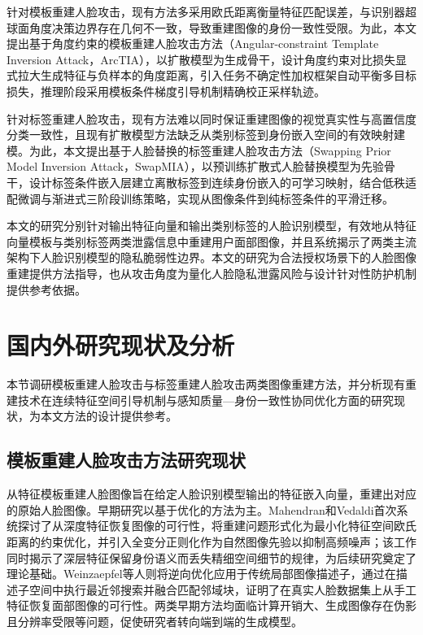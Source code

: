 针对模板重建人脸攻击，现有方法多采用欧氏距离衡量特征匹配误差，与识别器超球面角度决策边界存在几何不一致，导致重建图像的身份一致性受限。为此，本文提出基于角度约束的模板重建人脸攻击方法（Angular-constraint Template Inversion Attack，ArcTIA），以扩散模型为生成骨干，设计角度约束对比损失显式拉大生成特征与负样本的角度距离，引入任务不确定性加权框架自动平衡多目标损失，推理阶段采用模板条件梯度引导机制精确校正采样轨迹。

针对标签重建人脸攻击，现有方法难以同时保证重建图像的视觉真实性与高置信度分类一致性，且现有扩散模型方法缺乏从类别标签到身份嵌入空间的有效映射建模。为此，本文提出基于人脸替换的标签重建人脸攻击方法（Swapping Prior Model Inversion Attack，SwapMIA），以预训练扩散式人脸替换模型为先验骨干，设计标签条件嵌入层建立离散标签到连续身份嵌入的可学习映射，结合低秩适配微调与渐进式三阶段训练策略，实现从图像条件到纯标签条件的平滑迁移。

本文的研究分别针对输出特征向量和输出类别标签的人脸识别模型，有效地从特征向量模板与类别标签两类泄露信息中重建用户面部图像，并且系统揭示了两类主流架构下人脸识别模型的隐私脆弱性边界。本文的研究为合法授权场景下的人脸图像重建提供方法指导，也从攻击角度为量化人脸隐私泄露风险与设计针对性防护机制提供参考依据。


\section{国内外研究现状及分析}\label{sec:related_work}

本节调研模板重建人脸攻击与标签重建人脸攻击两类图像重建方法，并分析现有重建技术在连续特征空间引导机制与感知质量—身份一致性协同优化方面的研究现状，为本文方法的设计提供参考。

\subsection{模板重建人脸攻击方法研究现状}

从特征模板重建人脸图像旨在给定人脸识别模型输出的特征嵌入向量，重建出对应的原始人脸图像。早期研究以基于优化的方法为主。Mahendran和Vedaldi\cite{mahendran2015understanding}首次系统探讨了从深度特征恢复图像的可行性，将重建问题形式化为最小化特征空间欧氏距离的约束优化，并引入全变分正则化作为自然图像先验以抑制高频噪声；该工作同时揭示了深层特征保留身份语义而丢失精细空间细节的规律，为后续研究奠定了理论基础。Weinzaepfel等人\cite{weinzaepfel2011reconstructing}则将逆向优化应用于传统局部图像描述子，通过在描述子空间中执行最近邻搜索并融合匹配邻域块，证明了在真实人脸数据集上从手工特征恢复面部图像的可行性。两类早期方法均面临计算开销大、生成图像存在伪影且分辨率受限等问题，促使研究者转向端到端的生成模型。

